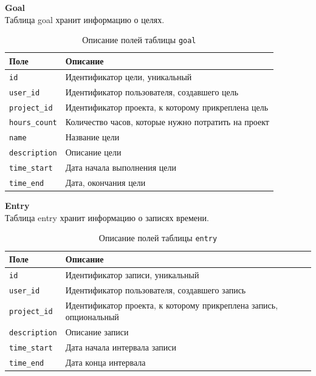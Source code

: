 \newpage

\noindent\textbf{Goal}\\
Таблица goal хранит информацию о целях.
\begin{table}[!ht]
	\caption{Описание полей таблицы \texttt{goal}}
	\label{tbl:goal}
	\begin{center}
		\begin{tabular}{|p{}|p{}|}
			\hline
			\textbf{Поле} & \textbf{Описание} \\\hline
			\texttt{id} & Идентификатор цели, уникальный \\\hline
			\texttt{user\_id} & Идентификатор пользователя, создавшего цель \\\hline
			\texttt{project\_id} & Идентификатор проекта, к которому прикреплена цель \\\hline
			\texttt{hours\_count} & Количество часов, которые нужно потратить на проект \\\hline	
			\texttt{name} & Название цели \\\hline
			\texttt{description} & Описание цели\\\hline
			\texttt{time\_start} & Дата начала выполнения цели \\\hline
			\texttt{time\_end} & Дата, окончания цели \\\hline	
	\end{tabular}
	\end{center}
\end{table}

\newpage

\noindent\textbf{Entry}\\
Таблица entry хранит информацию о записях времени.
\begin{table}[!ht]
	\caption{Описание полей таблицы \texttt{entry}}
	\label{tbl:entry}
	\begin{center}
		\begin{tabular}{|p{}|p{}|}
			\hline
			\textbf{Поле} & \textbf{Описание} \\\hline
			\texttt{id} & Идентификатор записи, уникальный \\\hline
			\texttt{user\_id} & Идентификатор пользователя, создавшего запись \\\hline
			\texttt{project\_id} & Идентификатор проекта, к которому прикреплена запись, опциональный \\\hline
			\texttt{description} & Описание записи\\\hline
			\texttt{time\_start} & Дата начала интервала записи \\\hline
			\texttt{time\_end} & Дата конца интервала \\\hline
		\end{tabular}
	\end{center}
\end{table}

